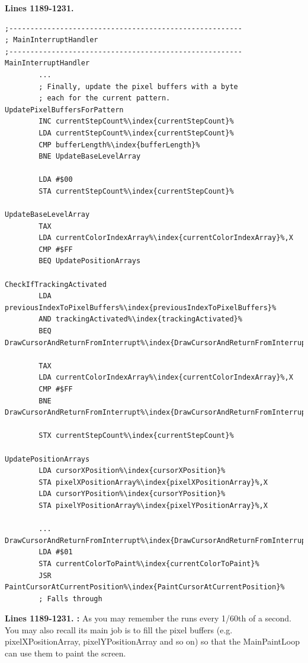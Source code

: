 \clearpage
\textbf{Lines 1189-1231. } 
\begin{lstlisting}[escapechar=\%]
;-------------------------------------------------------
; MainInterruptHandler
;-------------------------------------------------------
MainInterruptHandler
        ...
        ; Finally, update the pixel buffers with a byte
        ; each for the current pattern.        
UpdatePixelBuffersForPattern    
        INC currentStepCount%\index{currentStepCount}%
        LDA currentStepCount%\index{currentStepCount}%
        CMP bufferLength%\index{bufferLength}%
        BNE UpdateBaseLevelArray

        LDA #$00
        STA currentStepCount%\index{currentStepCount}%

UpdateBaseLevelArray   
        TAX 
        LDA currentColorIndexArray%\index{currentColorIndexArray}%,X
        CMP #$FF
        BEQ UpdatePositionArrays

CheckIfTrackingActivated
        LDA previousIndexToPixelBuffers%\index{previousIndexToPixelBuffers}%
        AND trackingActivated%\index{trackingActivated}%
        BEQ DrawCursorAndReturnFromInterrupt%\index{DrawCursorAndReturnFromInterrupt}%

        TAX 
        LDA currentColorIndexArray%\index{currentColorIndexArray}%,X
        CMP #$FF
        BNE DrawCursorAndReturnFromInterrupt%\index{DrawCursorAndReturnFromInterrupt}%

        STX currentStepCount%\index{currentStepCount}%

UpdatePositionArrays   
        LDA cursorXPosition%\index{cursorXPosition}%
        STA pixelXPositionArray%\index{pixelXPositionArray}%,X
        LDA cursorYPosition%\index{cursorYPosition}%
        STA pixelYPositionArray%\index{pixelYPositionArray}%,X

        ...
DrawCursorAndReturnFromInterrupt%\index{DrawCursorAndReturnFromInterrupt}%    
        LDA #$01
        STA currentColorToPaint%\index{currentColorToPaint}%
        JSR PaintCursorAtCurrentPosition%\index{PaintCursorAtCurrentPosition}%
        ; Falls through
\end{lstlisting}
\clearpage

\textbf{Lines 1189-1231. :} 
As you may remember the  runs every 1/60th of a
second.  You may also recall its main job is to fill the pixel buffers (e.g.
pixelXPositionArray, pixelYPositionArray and so on) so that the MainPaintLoop
can use them to paint the screen. 


